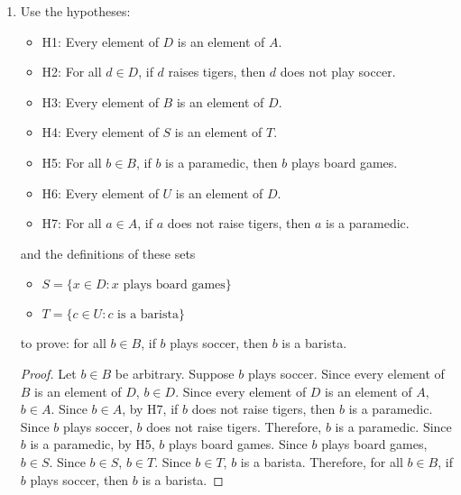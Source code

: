 \documentclass{article}
\begin{document}
\begin{enumerate}
    \newpage

    \item Use the hypotheses:
          \begin{itemize}
              \item H1: Every element of $D$ is an element of $A$.
              \item H2: For all $d \in D$, if $d$ raises tigers, then $d$ does not play soccer.
              \item H3: Every element of $B$ is an element of $D$.
              \item H4: Every element of $S$ is an element of $T$.
              \item H5: For all $b \in B$, if $b$ is a paramedic, then $b$ plays board games.
              \item H6: Every element of $U$ is an element of $D$.
              \item H7: For all $a \in A$, if $a$ does not raise tigers, then $a$ is a paramedic.
          \end{itemize}
          and the definitions of these sets
          \begin{itemize}
              \item $S = \{x \in D : x \text{ plays board games}\}$
              \item $T = \{c \in U : c \text{ is a barista}\}$
          \end{itemize}
          to prove: for all $b \in B$, if $b$ plays soccer, then $b$ is a barista.

          \begin{proof}
                  Let $b \in B$ be arbitrary. Suppose $b$ plays soccer. Since every element of $B$ is an element of $D$, $b \in D$. Since every element of $D$ is an element of $A$, $b \in A$. Since $b \in A$, by H7, if $b$ does not raise tigers, then $b$ is a paramedic. Since $b$ plays soccer, $b$ does not raise tigers. Therefore, $b$ is a paramedic. Since $b$ is a paramedic, by H5, $b$ plays board games. Since $b$ plays board games, $b \in S$. Since $b \in S$, $b \in T$. Since $b \in T$, $b$ is a barista. Therefore, for all $b \in B$, if $b$ plays soccer, then $b$ is a barista.
              \end{proof}

\end{enumerate}
\end{document}
